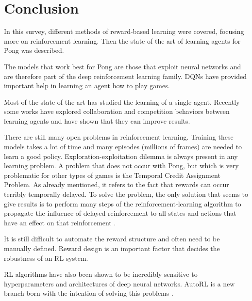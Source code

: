 \section{Conclusion}
\label{sec:conclusion}
In this survey, different methods of reward-based learning were covered, focusing more on reinforcement learning.
Then the state of the art of learning agents for Pong was described.

The models that work best for Pong are those that exploit neural networks and are therefore part of the deep reinforcement learning family.
%
DQNs have provided important help in learning an agent how to play games. 

Most of the state of the art has studied the learning of a single agent.
Recently some works have explored collaboration and competition behaviors between learning agents and have shown that they can improve results.

There are still many open problems in reinforcement learning.
Training these models takes a lot of time and many episodes (millions of frames) are needed to learn a good policy.
%
Exploration-exploitation dilemma is always present in any learning problem. 
%
A problem that does not occur with Pong, but which is very problematic for other types of games is the Temporal Credit Assignment Problem. 
As already mentioned, it refers to the fact that rewards can occur terribly temporally delayed. 
To solve the problem, the only solution that seems to give results is to perform many steps of the reinforcement-learning algorithm
 to propagate the influence of delayed reinforcement to all states and actions that have an effect on that reinforcement \cite{sutton1984temporal}. 

It is still difficult to automate the reward structure and often need to be manually defined. 
Reward design is an important factor that decides the robustness of an RL system.

RL algorithms have also been shown to be incredibly sensitive to hyperparameters and architectures of deep neural networks. 
AutoRL is a new branch born with the intention of solving this problems \cite{parker2022automated}.

